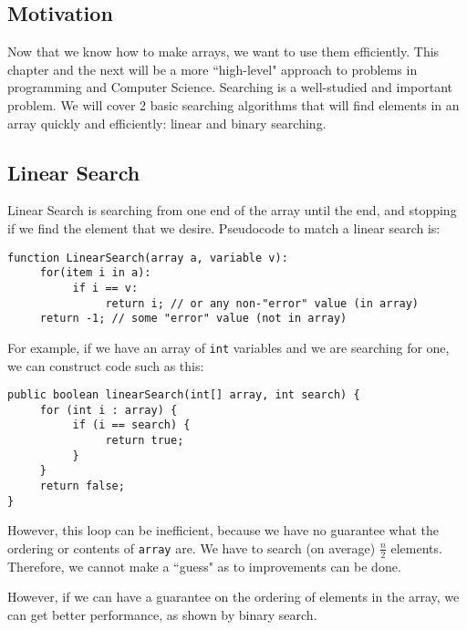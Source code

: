 
\subsection{Motivation}
Now that we know how to make arrays, we want to use them efficiently. This chapter and the next will be a more ``high-level" approach to problems in programming and Computer Science. Searching is a well-studied and important problem. We will cover 2 basic searching algorithms that will find elements in an array quickly and efficiently: linear and binary searching.

\subsection{Linear Search}
Linear Search is searching from one end of the array until the end, and stopping if we find the element that we desire. Pseudocode to match a linear search is:
\begin{verbatim}
function LinearSearch(array a, variable v):
     for(item i in a):
          if i == v:
               return i; // or any non-"error" value (in array)
     return -1; // some "error" value (not in array)
\end{verbatim}
For example, if we have an array of \verb|int| variables and we are searching for one, we can construct code such as this:
\begin{lstlisting}
public boolean linearSearch(int[] array, int search) {
     for (int i : array) {
          if (i == search) {
               return true;
          }
     }
     return false;
}
\end{lstlisting}
However, this loop can be inefficient, because we have no guarantee what the ordering or contents of \verb|array| are. We have to search (on average) $\frac{n}{2}$ elements. Therefore, we cannot make a ``guess" as to improvements can be done.

\par However, if we can have a guarantee on the ordering of elements in the array, we can get better performance, as shown by binary search.

